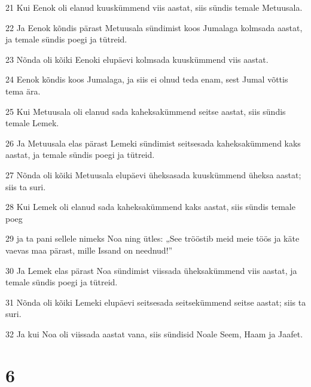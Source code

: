 \par 21 Kui Eenok oli elanud kuuskümmend viis aastat, siis sündis temale Metuusala.
\par 22 Ja Eenok kõndis pärast Metuusala sündimist koos Jumalaga kolmsada aastat, ja temale sündis poegi ja tütreid.
\par 23 Nõnda oli kõiki Eenoki elupäevi kolmsada kuuskümmend viis aastat.
\par 24 Eenok kõndis koos Jumalaga, ja siis ei olnud teda enam, sest Jumal võttis tema ära.
\par 25 Kui Metuusala oli elanud sada kaheksakümmend seitse aastat, siis sündis temale Lemek.
\par 26 Ja Metuusala elas pärast Lemeki sündimist seitsesada kaheksakümmend kaks aastat, ja temale sündis poegi ja tütreid.
\par 27 Nõnda oli kõiki Metuusala elupäevi üheksasada kuuskümmend üheksa aastat; siis ta suri.
\par 28 Kui Lemek oli elanud sada kaheksakümmend kaks aastat, siis sündis temale poeg
\par 29 ja ta pani sellele nimeks Noa ning ütles: „See trööstib meid meie töös ja käte vaevas maa pärast, mille Issand on neednud!”
\par 30 Ja Lemek elas pärast Noa sündimist viissada üheksakümmend viis aastat, ja temale sündis poegi ja tütreid.
\par 31 Nõnda oli kõiki Lemeki elupäevi seitsesada seitsekümmend seitse aastat; siis ta suri.
\par 32 Ja kui Noa oli viissada aastat vana, siis sündisid Noale Seem, Haam ja Jaafet.

\chapter{6}

